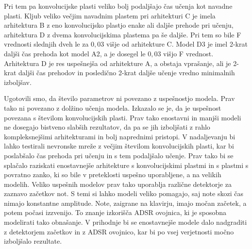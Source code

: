 \documentclass[a4paper, 12pt, openright]{book}
\begin{document}
Pri tem pa konvolucijske plasti veliko bolj podaljšajo čas učenja kot navadne plasti.
Kljub veliko večjim navadnim plastem pri arhitekturi C je imela arhitektura B z eno konvolucijsko plastjo enake ali daljše prehode pri učenju, arhitektura D z dvema konvolucijskima plastema pa še daljše.
Pri tem so bile F vrednosti slednjih dveh le za $ 0,03 $ višje od arhitekture C.
Model D3 je imel 2-krat daljši čas prehoda kot model A2, a je dosegel le $ 0,03 $ višjo F vrednost.
Arhitektura D je res uspešnejša od arhitekture A, a obstaja vprašanje, ali je 2-krat daljši čas prehodov in posledično 2-krat daljše učenje vredno minimalnih izboljšav.

Ugotovili smo, da število parametrov ni povezano z uspešnostjo modela.
Prav tako ni povezano z dolžino učenja modela.
Izkazalo se je, da je uspešnost povezana s številom konvolucijskih plasti.
Prav tako enostavni in manjši modeli ne dosegajo bistveno slabših rezultatov, da pa se jih izboljšati z rahlo kompleksnejšimi arhitekturami in bolj naprednimi pristopi.
V nadaljevanju bi lahko testirali nevronske mreže z večjim številom konvolucijskih plasti, kar bi poslabšalo čas prehoda pri učenju in s tem podaljšalo učenje.
Prav tako bi se splačalo raziskati enostavnejše arhitekture s konvolucijskimi plastmi in s plastmi s povratno zanko, ki so bile v preteklosti uspešno uporabljene, a na velikih modelih.
Veliko uspešnih modelov prav tako uporablja različne detektorje za zaznavo začetkov not.
S temi si lahko modeli veliko pomagajo, saj note skozi čas nimajo konstantne amplitude.
Note, zaigrane na klavirju, imajo močan začetek, a potem počasi izzvenijo.
To znanje izkorišča ADSR ovojnica, ki je sposobna modelirati tako obnašanje.
V prihodnje bi se enostavnejše modele dalo nadgraditi z detektorjem začetkov in z ADSR ovojnico, kar bi po vsej verjetnosti močno izboljšalo rezultate.






\printbibliography[heading=bibintoc,title={Literatura}]
\end{document}
